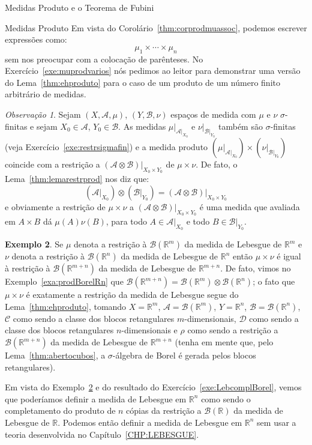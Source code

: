 \documentclass[oneside,final,11pt]{amsbook}
\newcommand{\R}{\mathds R}
\newcommand{\Borel}{\mathcal B}
\theoremstyle{remark}\newtheorem{exercise}{Exercício}[chapter]
\theoremstyle{remark}\newtheorem{*exercise}[exercise]{\hbox to 0pt{\hskip 0pt minus 1fil*}Exercício}
\theoremstyle{definition}\newtheorem{exdefin}{Definição}[chapter]
\theoremstyle{plain}\newtheorem{teo}{Teorema}[section]
\theoremstyle{plain}\newtheorem{lem}[teo]{Lema}
\theoremstyle{plain}\newtheorem{prop}[teo]{Proposição}
\theoremstyle{plain}\newtheorem{cor}[teo]{Corolário}
\theoremstyle{definition}\newtheorem{defin}[teo]{Definição}
\theoremstyle{remark}\newtheorem{rem}[teo]{Observação}
\theoremstyle{definition}\newtheorem{notation}[teo]{Notação}
\theoremstyle{definition}\newtheorem{convention}[teo]{Convenção}
\theoremstyle{definition}\newtheorem{example}[teo]{Exemplo}
\numberwithin{section}{chapter}
\numberwithin{equation}{section}
\begin{document}
\begin{chapter}{Medidas Produto e o Teorema de Fubini}
\begin{section}{Medidas Produto}
Em vista do Corolário~\ref{thm:corprodmuassoc}, podemos escrever expressões como:
\[\mu_1\times\cdots\times\mu_n\]
sem nos preocupar com a colocação de parênteses. No Exercício~\ref{exe:muprodvarios} nós pedimos ao leitor
para demonstrar uma versão do Lema~\ref{thm:ehproduto} para o caso de um produto de um número finito arbitrário
de medidas.

\begin{rem}
Sejam $(X,\mathcal A,\mu)$, $(Y,\mathcal B,\nu)$ espaços de medida com $\mu$ e $\nu$
$\sigma$-finitas e sejam $X_0\in\mathcal A$, $Y_0\in\mathcal B$. As medidas
$\mu\vert_{\mathcal A\vert_{X_0}}$ e $\nu\vert_{\mathcal B\vert_{Y_0}}$ também são
$\sigma$-finitas (veja Exercício~\ref{exe:restrsigmafin}) e a medida produto
$(\mu\vert_{\mathcal A\vert_{X_0}})\times(\nu\vert_{\mathcal B\vert_{Y_0}})$
coincide com a restrição a $(\mathcal A\otimes\mathcal B)\vert_{X_0\times Y_0}$
de $\mu\times\nu$. De fato, o Lema~\ref{thm:lemarestrprod} nos diz que:
\[(\mathcal A\vert_{X_0})\otimes(\mathcal B\vert_{Y_0})=(\mathcal A\otimes\mathcal B)\vert_{X_0\times Y_0}\]
e obviamente a restrição de $\mu\times\nu$ a $(\mathcal A\otimes\mathcal B)\vert_{X_0\times Y_0}$
é uma medida que avaliada em $A\times B$ dá $\mu(A)\nu(B)$, para todo $A\in\mathcal A\vert_{X_0}$
e todo $B\in\mathcal B\vert_{Y_0}$.
\end{rem}

\begin{example}\label{exa:prodmedLebesgue}
Se $\mu$ denota a restrição à $\Borel(\R^m)$ da medida de Lebesgue de $\R^m$ e $\nu$ denota a restrição à $\Borel(\R^n)$
da medida de Lebesgue de $\R^n$ então $\mu\times\nu$ é igual à restrição à $\Borel(\R^{m+n})$ da medida de Lebesgue de $\R^{m+n}$.
De fato, vimos no Exemplo~\ref{exa:prodBorelRn} que $\Borel(\R^{m+n})=\Borel(\R^m)\otimes\Borel(\R^n)$; o fato que $\mu\times\nu$
é exatamente a restrição da medida de Lebesgue segue do Lema~\ref{thm:ehproduto}, tomando $X=\R^m$, $\mathcal A=\Borel(\R^m)$,
$Y=\R^n$, $\mathcal B=\Borel(\R^n)$, $\mathcal C$ como sendo a classe dos blocos retangulares $m$-dimensionais,
$\mathcal D$ como sendo a classe dos blocos retangulares $n$-dimensionais e $\rho$ como sendo a restrição a
$\Borel(\R^{m+n})$ da medida de Lebesgue de $\R^{m+n}$ (tenha em mente que, pelo Lema~\ref{thm:abertocubos},
a $\sigma$-álgebra de Borel é gerada pelos blocos retangulares).
\end{example}
Em vista do Exemplo~\ref{exa:prodmedLebesgue} e do resultado do Exercício~\ref{exe:LebcomplBorel},
vemos que poderíamos definir a medida de Lebesgue em $\R^n$ como sendo o completamento do produto de $n$ cópias
da restrição a $\Borel(\R)$ da medida de Lebesgue de $\R$. Podemos então definir a medida de Lebesgue em $\R^n$
sem usar a teoria desenvolvida no Capítulo~\ref{CHP:LEBESGUE}.


\end{section}
\end{chapter}
\end{document}
